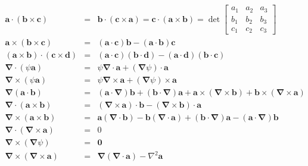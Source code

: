 

\begin{eqnarray}
    \mathbf{a} \cdot(\mathbf{b} \times \mathbf{c}) & = & \mathbf{b} \cdot(\mathbf{c} \times \mathbf{a}) = \mathbf{c} \cdot(\mathbf{a} \times \mathbf{b}) = \operatorname{det}\left[\begin{array}{lll}
    a_1 & a_2 & a_3 \\
    b_1 & b_2 & b_3 \\
    c_1 & c_2 & c_3
    \end{array}\right] \\
    \mathbf{a} \times(\mathbf{b} \times \mathbf{c}) & = & (\mathbf{a} \cdot \mathbf{c}) \mathbf{b} - (\mathbf{a} \cdot \mathbf{b}) \mathbf{c} \\
    (\mathbf{a} \times \mathbf{b}) \cdot(\mathbf{c} \times \mathbf{d}) & = & (\mathbf{a} \cdot \mathbf{c})(\mathbf{b} \cdot \mathbf{d}) - (\mathbf{a} \cdot \mathbf{d})(\mathbf{b} \cdot \mathbf{c}) \\
    \boldsymbol{\nabla} \cdot(\psi \mathbf{a}) & = & \psi \boldsymbol{\nabla} \cdot \mathbf{a} + (\boldsymbol{\nabla} \psi) \cdot \mathbf{a} \\
    \boldsymbol{\nabla} \times(\psi \mathbf{a}) & = & \psi \boldsymbol{\nabla} \times \mathbf{a} + (\boldsymbol{\nabla} \psi) \times \mathbf{a} \\
    \boldsymbol{\nabla}(\mathbf{a} \cdot \mathbf{b}) & = & (\mathbf{a} \cdot \boldsymbol{\nabla}) \mathbf{b} + (\mathbf{b} \cdot \boldsymbol{\nabla}) \mathbf{a} + \mathbf{a} \times (\boldsymbol{\nabla} \times \mathbf{b}) + \mathbf{b} \times (\boldsymbol{\nabla} \times \mathbf{a}) \\
    \boldsymbol{\nabla} \cdot(\mathbf{a} \times \mathbf{b}) & = & (\boldsymbol{\nabla} \times \mathbf{a}) \cdot \mathbf{b} - (\boldsymbol{\nabla} \times \mathbf{b}) \cdot \mathbf{a} \\
    \boldsymbol{\nabla} \times(\mathbf{a} \times \mathbf{b}) & = & \mathbf{a}(\boldsymbol{\nabla} \cdot \mathbf{b}) - \mathbf{b}(\boldsymbol{\nabla} \cdot \mathbf{a}) + (\mathbf{b} \cdot \boldsymbol{\nabla}) \mathbf{a} - (\mathbf{a} \cdot \boldsymbol{\nabla}) \mathbf{b} \\
    \boldsymbol{\nabla} \cdot(\boldsymbol{\nabla} \times \mathbf{a}) & = & 0 \\
    \boldsymbol{\nabla} \times(\boldsymbol{\nabla} \psi) & = & \mathbf{0} \\
    \boldsymbol{\nabla} \times(\boldsymbol{\nabla} \times \mathbf{a}) & = & \boldsymbol{\nabla}(\boldsymbol{\nabla} \cdot \mathbf{a}) - \nabla^2 \mathbf{a}
\end{eqnarray}
    

